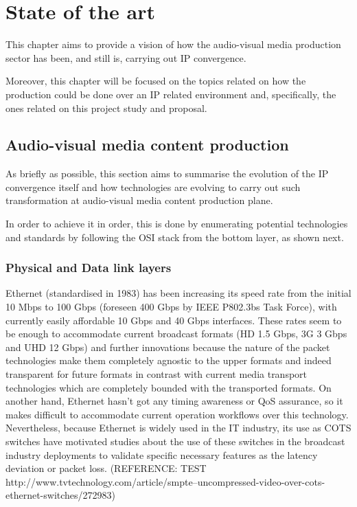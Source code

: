 \chapter{State of the art}\label{A:stateOfTheArt}

This chapter aims to provide a vision of how the audio-visual media production sector has been, and still is, carrying out IP convergence. 

Moreover, this chapter will be focused on the topics related on how the production could be done over an IP related environment and, specifically, the ones related on this project study and proposal.

\section{Audio-visual media content production}

As briefly as possible, this section aims to summarise the evolution of the IP convergence itself and how technologies are evolving to carry out such transformation at audio-visual media content production plane.

In order to achieve it in order, this is done by enumerating potential technologies and standards by following the OSI stack from the bottom layer, as shown next.

\subsection{Physical and Data link layers}

Ethernet (standardised in 1983) has been increasing its speed rate from the initial 10 Mbps to 100 Gbps (foreseen 400 Gbps by IEEE P802.3bs Task Force), with currently easily affordable 10 Gbps and 40 Gbps interfaces. These rates seem to be enough to accommodate current broadcast formats (HD 1.5 Gbps, 3G 3 Gbps and UHD 12 Gbps) and further innovations because the nature of the packet technologies make them completely agnostic to the upper formats and indeed transparent for future formats in contrast with current media transport technologies which are completely bounded with the transported formats. On another hand, Ethernet hasn't got any timing awareness or QoS assurance, so it makes difficult to accommodate current operation workflows over this technology. Nevertheless, because Ethernet is widely used in the IT industry, its use as COTS switches have motivated studies about the use of these switches in the broadcast industry deployments to validate specific necessary
features as the latency deviation or packet loss. (REFERENCE: TEST http://www.tvtechnology.com/article/smpte--uncompressed-video-over-cots-ethernet-switches/272983)

